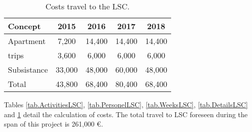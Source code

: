 \begin{table}[h!]
\begin{center}
\begin{tabular}{|l|c|c|c|c|}
\hline	
Concept &	2015 &	2016 &	2017 &	2018\\
\hline						
Apartment	 & 7,200 &	14,400 &	14,400 &14,400 \\
trips	& 3,600 &	6,000 &	6,000 &	6,000 \\
Subsistance &	33,000 &	48,000	& 60,000 & 48,000 \\
\hline
Total &	43,800 &	68,400 &	80,400 &	68,400 \\				
\hline \hline				
\end{tabular}  
\caption{Costs travel to the LSC.}
\label{tab.CostsLSC}
\end{center}
\end{table}

Tables \ref{tab.ActivitiesLSC}, \ref{tab.PersonelLSC},  
\ref{tab.WeeksLSC}, \ref{tab.DetailsLSC} and  \ref{tab.CostsLSC} detail the calculation of costs. The total travel to LSC foreseen during the span of this project is 261,000 \euro.


